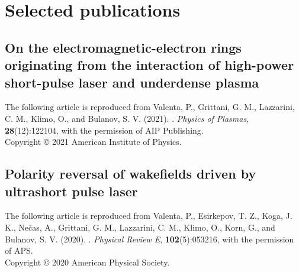 \documentclass[10pt, a4paper, twoside, openright]{report}
\newcommand{\link}[3][blue]{\href{#2}{\color{#1}{#3}}}%
\begin{document}
\chapter{Selected publications\label{chap:selected_publications}}
%

\newpage
\thispagestyle{empty}
\mbox{}

\newpage
\section{On the electromagnetic-electron rings originating from the interaction of high-power short-pulse laser and underdense plasma\label{sec:paper_1}}

The following article is reproduced from Valenta, P., Grittani, G. M., Lazzarini, C. M., Klimo, O., and Bulanov, S. V. (2021). \link{https://doi.org/10.1063/5.0065167}{On the electromagnetic-electron rings originating from the interaction of high-power short-pulse laser and underdense plasma}. \textit{Physics of Plasmas}, \textbf{28}(12):122104, with the permission of AIP Publishing. \\

\noindent Copyright {\copyright} {2021} {American Institute of Physics}.

\newpage
\thispagestyle{empty}
\mbox{}



\newpage
\thispagestyle{empty}
\mbox{}




\newpage
\section{Polarity reversal of wakefields driven by ultrashort pulse laser\label{sec:paper_2}}

The following article is reproduced from Valenta, P., Esirkepov, T. Z., Koga, J. K., Nečas, A., Grittani, G. M., Lazzarini, C. M., Klimo, O., Korn, G., and Bulanov, S. V. (2020). \link{https://doi.org/10.1103/PhysRevE.102.053216}{Polarity reversal of wakefields driven by ultrashort pulse laser}. \textit{Physical Review E}, \textbf{102}(5):053216, with the permission of APS. \\

\noindent Copyright {\copyright} {2020} {American Physical Society}.
\end{document}
